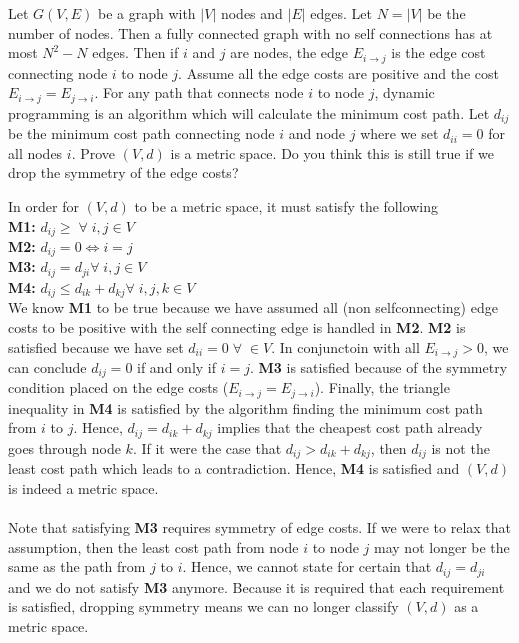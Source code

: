 \documentclass[11pt]{SelfArxOneColBMN}
\begin{document}
\begin{exercise}
  Let $G(V,E)$ be a graph with $|V|$ nodes and $|E|$ edges. Let $N = |V|$ be the number of nodes. Then a fully connected graph with no self connections has at most $N^2 - N$ edges. Then if $i$ and $j$ are nodes, the edge $E_{i \rightarrow j}$ is the edge cost connecting node $i$ to node $j$. Assume all the edge costs are positive and the cost $E_{i\rightarrow j} = E_{j\rightarrow i}$. For any path that connects node $i$ to node $j$, dynamic programming is an algorithm which will calculate the minimum cost path. Let $d_{ij}$ be the minimum cost path connecting node $i$ and node $j$ where we set $d_{ii} = 0$ for all nodes $i$. Prove $(V,d)$ is a metric space. Do you think this is still true if we drop the symmetry of the edge costs?
  \begin{solution}
    In order for $(V,d)$ to be a metric space, it must satisfy the following\\
    \indent \textbf{M1: }$d_{ij} \geq \; \forall \; i,j \in V$\\
    \indent \textbf{M2: }$d_{ij} = 0 \iff i = j$\\
    \indent \textbf{M3: }$d_{ij} = d_{ji} \forall \; i,j \in V$\\
    \indent \textbf{M4: }$d_{ij} \leq d_{ik} + d_{kj} \forall \; i,j,k \in V$\\
    We know \textbf{M1} to be true because we have assumed all (non selfconnecting) edge costs to be positive with the self connecting edge is handled in \textbf{M2}. \textbf{M2} is satisfied because we have set $d_{ii} = 0 \; \forall \; \in V$. In conjunctoin with all $E_{i\rightarrow j} > 0$, we can conclude $d_{ij} = 0$ if and only if $i = j$. \textbf{M3} is satisfied because of the symmetry condition placed on the edge costs ($E_{i\rightarrow j} = E_{j\rightarrow i}$). Finally, the triangle inequality in \textbf{M4} is satisfied by the algorithm finding the minimum cost path from $i$ to $j$. Hence, $d_{ij} = d_{ik} + d_{kj}$ implies that the cheapest cost path already goes through node $k$. If it were the case that $d_{ij} > d_{ik} + d_{kj}$, then $d_{ij}$ is not the least cost path which leads to a contradiction. Hence, \textbf{M4} is satisfied and $(V,d)$ is indeed a metric space.\\
    \\
    Note that satisfying \textbf{M3} requires symmetry of edge costs. If we were to relax that assumption, then the least cost path from node $i$ to node $j$ may not longer be the same as the path from $j$ to $i$. Hence, we cannot state for certain that $d_{ij} = d_{ji}$ and we do not satisfy \textbf{M3} anymore. Because it is required that each requirement is satisfied, dropping symmetry means we can no longer classify $(V,d)$ as a metric space.
    \end{solution}
\end{exercise}
\end{document}
